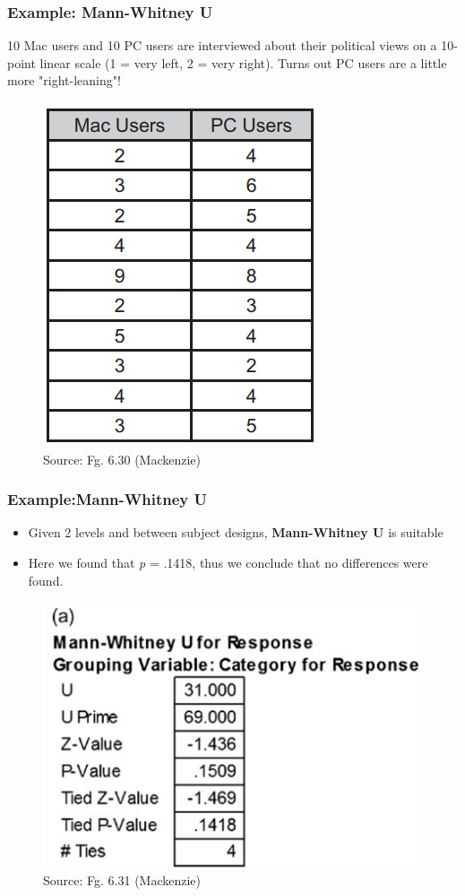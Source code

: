\documentclass{beamer}
\begin{document}
\begin{frame}
	\frametitle{Example: Mann-Whitney U} 
	10 Mac users and 10 PC users are interviewed about their political views on a 10-point linear scale (1 = very left, 2 = very right).  Turns out PC users are a little more "right-leaning"!
	\begin{figure}
		\includegraphics[width=0.3\linewidth]{6-30}
		\caption{Source: Fg. 6.30 (Mackenzie)}
	\end{figure}
\end{frame}


\begin{frame}
	\frametitle{Example:Mann-Whitney U} 
	\begin{itemize}
		\item Given 2 levels and between subject designs, \textbf{Mann-Whitney U} is suitable %
		\item Here we found that \textit{p} = .1418, thus we conclude that no differences were found.
	\end{itemize}
	\begin{figure}
		\includegraphics[width=0.4\linewidth]{6-31}
		\caption{Source: Fg. 6.31 (Mackenzie)}
	\end{figure}
\end{frame}
\end{document}

